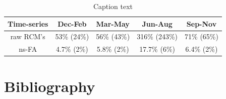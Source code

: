 \documentclass[a4paper,11pt]{article}
\begin{document}
\begin{table}[H]
\begin{minipage}{300pt}
\caption{Caption text}\label{tab1}%
\begin{tabular}{ccccc}

\toprule
Time-series & Dec-Feb & Mar-May & Jun-Aug & Sep-Nov \\
\midrule
raw RCM's    & 53\% (24\%) & 56\% (43\%)& 316\% (243\%)& 71\% (65\%) \\
ns-FA        & 4.7\% (2\%) & 5.8\% (2\%)& 17.7\% (6\%)& 6.4\% (2\%) \\

\end{tabular}
\end{minipage}
\end{table}



\section{Bibliography}\label{sec5}



\nocite{*}
	
\end{document}
